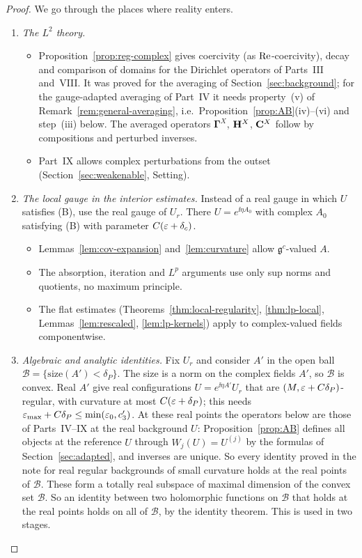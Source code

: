 \begin{proof}
We go through the places where reality enters.
\begin{enumerate}[label=(\roman*)]
\item \emph{The $L^2$ theory.}
  \begin{itemize}
  \item Proposition~\ref{prop:reg-complex} gives coercivity (as $\operatorname{Re}$-coercivity), decay and comparison of domains for the Dirichlet operators of Parts~III and~VIII. It was proved for the averaging of Section~\ref{sec:background}; for the gauge-adapted averaging of Part~IV it needs property~(v) of Remark~\ref{rem:general-averaging}, i.e.\ Proposition~\ref{prop:AB}(iv)--(vi) and step~(iii) below. The averaged operators $\boldsymbol\Gamma^X$, $\mathbf H^X$, $\mathbf C^X$ follow by compositions and perturbed inverses.
  \item Part~IX allows complex perturbations from the outset (Section~\ref{sec:weakenable}, Setting).
  \end{itemize}
\item \emph{The local gauge in the interior estimates.} Instead of a real gauge in which $U$ satisfies (B), use the real gauge of $U_r$. There $U=e^{\ii\eta A_0}$ with complex $A_0$ satisfying (B) with parameter $C(\varepsilon+\delta_c)$.
  \begin{itemize}
  \item Lemmas~\ref{lem:cov-expansion} and~\ref{lem:curvature} allow $\mathfrak g^c$-valued $A$.
  \item The absorption, iteration and $L^p$ arguments use only sup norms and quotients, no maximum principle.
  \item The flat estimates (Theorems~\ref{thm:local-regularity}, \ref{thm:lp-local}, Lemmas~\ref{lem:rescaled}, \ref{lem:lp-kernels}) apply to complex-valued fields componentwise.
  \end{itemize}
\item \emph{Algebraic and analytic identities.} Fix $U_r$ and consider $A'$ in the open ball $\mathcal B=\{\text{size}(A')<\delta_P\}$. The size is a norm on the complex fields $A'$, so $\mathcal B$ is convex. Real $A'$ give real configurations $U=e^{\ii\eta A'}U_r$ that are $(M,\varepsilon+C\delta_P)$-regular, with curvature at most $C(\varepsilon+\delta_P)$; this needs $\varepsilon_{\max}+C\delta_P\le\min(\varepsilon_0,c'_3)$. At these real points the operators below are those of Parts~IV--IX at the real background $U$: Proposition~\ref{prop:AB} defines all objects at the reference $U$ through $W_j(U)=U^{(j)}$ by the formulas of Section~\ref{sec:adapted}, and inverses are unique. So every identity proved in the note for real regular backgrounds of small curvature holds at the real points of $\mathcal B$. These form a totally real subspace of maximal dimension of the convex set $\mathcal B$. So an identity between two holomorphic functions on $\mathcal B$ that holds at the real points holds on all of $\mathcal B$, by the identity theorem. This is used in two stages.

\end{enumerate}
\end{proof}
